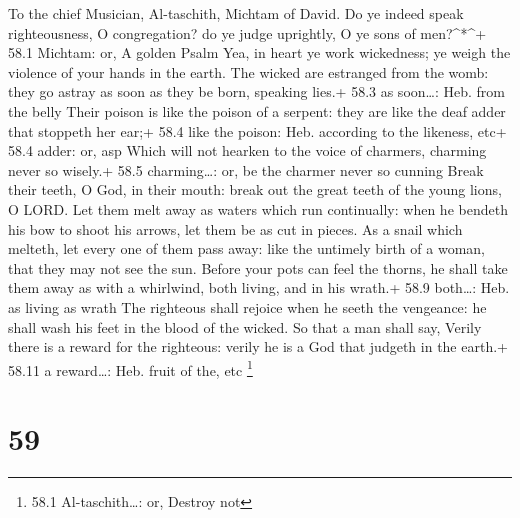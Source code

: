 To the chief Musician, Al-taschith, Michtam of David.  Do ye
indeed speak righteousness, O congregation? do ye judge uprightly, O ye
sons of men?\^{}*\^{}+ 58.1 Michtam: or, A golden Psalm 
Yea, in heart ye work wickedness; ye weigh the violence of your hands in
the earth.  The wicked are estranged from the womb: they go
astray as soon as they be born, speaking lies.+ 58.3 as soon\ldots: Heb.
from the belly  Their poison is like the poison of a
serpent: they are like the deaf adder that stoppeth her ear;+ 58.4 like
the poison: Heb. according to the likeness, etc+ 58.4 adder: or, asp
 Which will not hearken to the voice of charmers, charming
never so wisely.+ 58.5 charming\ldots: or, be the charmer never so
cunning  Break their teeth, O God, in their mouth: break out
the great teeth of the young lions, O LORD.  Let them melt
away as waters which run continually: when he bendeth his bow to shoot
his arrows, let them be as cut in pieces.  As a snail which
melteth, let every one of them pass away: like the untimely birth of a
woman, that they may not see the sun.  Before your pots can
feel the thorns, he shall take them away as with a whirlwind, both
living, and in his wrath.+ 58.9 both\ldots: Heb. as living as wrath
 The righteous shall rejoice when he seeth the vengeance:
he shall wash his feet in the blood of the wicked.  So that
a man shall say, Verily there is a reward for the righteous: verily he
is a God that judgeth in the earth.+ 58.11 a reward\ldots: Heb. fruit of
the, etc \footnote{58.1 Al-taschith\ldots: or, Destroy not}

\hypertarget{section-58}{%
\section{59}\label{section-58}}

